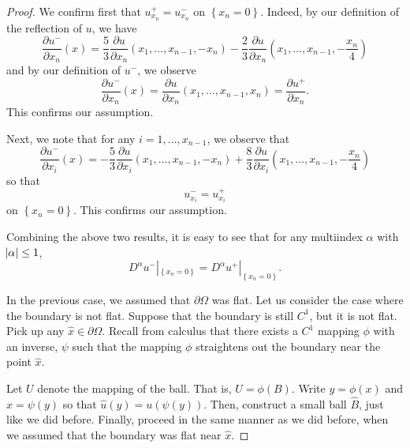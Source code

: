 \documentclass[10pt]{article}
\begin{document}
\begin{proof}
	We confirm first that $u^+_{x_n} = u^-_{x_n}$ on $\left\{ x_n = 0 \right\}$. Indeed, by our definition of the reflection of $u$, we have 
	\begin{equation*}
		\displaystyle \frac{\partial u^-}{\partial x_n}(x) = \frac{5}{3}\frac{\partial u}{\partial x_n}(x_1,\dots,x_{n-1},-x_n) - \frac{2}{3}\frac{\partial u}{\partial x_n}(x_1,\dots,x_{n-1},-\frac{x_n}{4})
	\end{equation*}
	and by our definition of $u^-$, we observe
	\begin{equation*}
		\displaystyle \frac{\partial u^-}{\partial x_n}(x) = \frac{\partial u}{\partial x_n}(x_1,\dots,x_{n-1},x_n) = \frac{\partial u^+}{\partial x_n}.
	\end{equation*}
	This confirms our assumption. 
	
	Next, we note that for any $i = 1,\dots, x_{n-1}$, we observe that 
	\begin{equation*}
		\displaystyle \frac{\partial u^-}{\partial x_i}(x) = -\frac{5}{3}\frac{\partial u}{\partial x_i}(x_1,\dots,x_{n-1},-x_n) + \frac{8}{3}\frac{\partial u}{\partial x_i}(x_1,\dots,x_{n-1},-\frac{x_n}{4})
	\end{equation*}
	so that
	\begin{equation*}
		u_{x_i}^- = u_{x_i}^+ 
	\end{equation*}
	on $\left\{x_n = 0\right\}$. This confirms our assumption. 
	
	Combining the above two results, it is easy to see that for any multiindex $\alpha$ with $\abs{\alpha} \leq 1$, 
	\begin{equation*}
		\displaystyle D^\alpha u^-|_{\left\{x_n=0\right\}} = D^{\alpha} u^+|_{\left\{x_n=0\right\}}.
	\end{equation*} 
	
	In the previous case, we assumed that $\partial \Omega$ was flat. Let us consider the case where the boundary is not flat. Suppose that the boundary is still $C^1$, but it is not flat. Pick up any $\hat{x} \in \partial \Omega$. Recall from calculus that there exists a $C^1$ mapping $\phi$ with an inverse, $\psi$ such that the mapping $\phi$ straightens out the boundary near the point $\hat{x}$. 
	
	Let $U$ denote the mapping of the ball. That is, $U = \phi(B)$. Write $y = \phi(x)$ and $x = \psi(y)$ so that $\hat{u}(y) = u(\psi(y))$. Then, construct a small ball $\hat{B}$, just like we did before. Finally, proceed in the same manner as we did before, when we assumed that the boundary was flat near $\hat{x}$. 
	

\end{proof}
\end{document}
